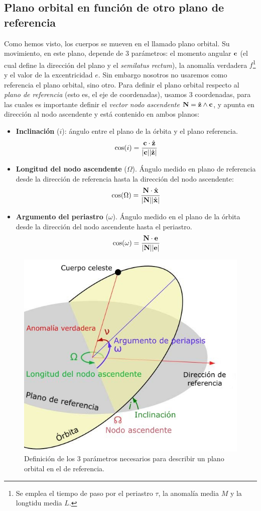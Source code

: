\subsection{Plano orbital en función de otro plano de referencia}

Como hemos visto, los cuerpos se mueven en el llamado plano orbital. Su movimiento, en este plano, depende de 3 parámetros: el momento angular $\mathbf{c}$ (el cual define la dirección del plano y el \textit{semilatus rectum}), la anomalía verdadera $f$\footnote{Se emplea el tiempo de paso por el periastro $\tau$, la anomalía media $M$ y la longtidu media $L$.} y el valor de la excentricidad $e$.  Sin embargo nosotros no usaremos como referencia el plano orbital, sino otro. Para definir el plano orbital respecto al \textit{plano de referencia} (esto es, el eje de coordenadas), usamos 3 coordenadas, para las cuales es importante definir el \textit{vector nodo ascendente} $\mathbf{N}=\hat{\mathbf{z}}\wedge\mathbf{c}$, y apunta en dirección al nodo ascendente y está contenido en ambos planos:
\begin{itemize}
    \item \textbf{Inclinación} ($i$): ángulo entre el plano de la órbita y el plano referencia. 
    \begin{equation}
        \cos (i) = \frac{\mathbf{c} \cdot \hat{\mathbf{z}}}{|\mathbf{c}||\hat{\mathbf{z}}|}
    \end{equation}
    \item \textbf{Longitud del nodo ascendente} ($\Omega$). Ángulo medido en plano de referencia desde la dirección de referencia hasta la dirección del nodo ascendente:
    \begin{equation}
        \cos (\Omega) = \frac{\mathbf{N} \cdot \hat{\mathbf{x}}}{|\mathbf{N}||\hat{\mathbf{x}}|}
    \end{equation}
    \item \textbf{Argumento del periastro} ($\omega$). Ángulo medido en el plano de la órbita desde la dirección del nodo ascendente hasta el periastro. 
    \begin{equation}
        \cos (\omega) = \frac{\mathbf{N} \cdot \mathbf{e}}{|\mathbf{N}||\mathbf{e}|}
    \end{equation}    
\end{itemize}
\begin{figure}[h!] \centering
    \includegraphics[width=0.6\linewidth]{Cuerpo/Ch_02/02_Elementos_orbitales.jpg}
    \caption{Definición de los 3 parámetros necesarios para describir un plano orbital en el de referencia.}
\end{figure}



